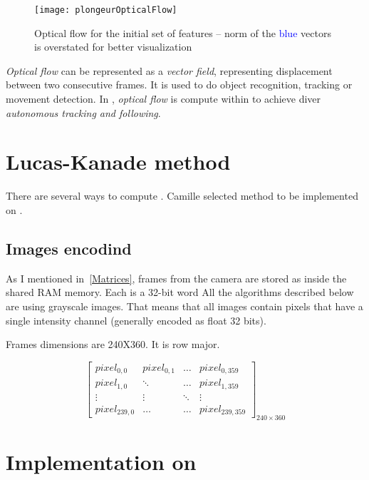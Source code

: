 \begin{figure}[!htbp]
	\centering
	\texttt{[image: plongeurOpticalFlow]}
	\caption{Optical flow for the initial set of features -- \small{norm of the \textcolor{blue}{blue} vectors is overstated for better visualization}}
	\label{opticalFlowFig}
\end{figure}
\FloatBarrier

\emph{Optical flow} can be represented as a \emph{vector field}, representing  displacement between two consecutive frames. It is used to do object recognition, tracking or movement detection. In \iBubble, \emph{optical flow} is compute within  to achieve diver \emph{autonomous tracking and following}.\par


\section{Lucas-Kanade method}

There are several ways to compute . Camille selected  method to be implemented on \vc.

\subsection{Images encodind}

As I mentioned in~\ref{Matrices}, frames from the \rasp{} camera are stored as  inside the shared RAM memory. Each  is a 32-bit word All the algorithms described below are using grayscale images. That means that all
images contain pixels that have a single intensity channel (generally encoded as float 32 bits).

Frames dimensions are 240X360. It is row major.

\[
\begin{bmatrix}
pixel_{0,0} & pixel_{0,1} & \ldots & pixel_{0,359}\\
pixel_{1,0} & \ddots & \ldots & pixel_{1,359}\\
\vdots & \vdots & \ddots & \vdots\\
pixel_{239,0} & \ldots & \ldots & pixel_{239,359}
\end{bmatrix}_{240\times 360}
\]


\section{Implementation on \vc}

